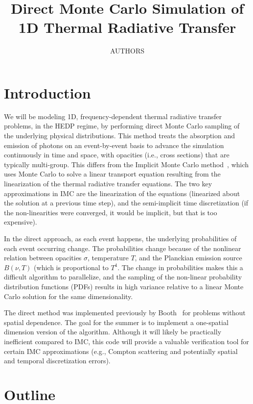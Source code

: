 \documentclass{article}
\title{Direct Monte Carlo Simulation of 1D Thermal Radiative Transfer}
\author{AUTHORS}
\begin{document}
\onehalfspacing

\section{Introduction}

We will be modeling 1D, frequency-dependent thermal radiative transfer problems,
in the HEDP regime, by performing direct Monte Carlo sampling of
the underlying physical distributions.  This method treats the absorption and
emission of photons on an event-by-event basis to advance the simulation
continuously in time and space, with opacities (i.e., cross sections) that are typically
multi-group.  This differs from the Implicit Monte Carlo
method~\cite{wollaber_review,wollaber_thesis}, which uses Monte
Carlo to solve a linear transport equation resulting from the linearization of
the thermal radiative transfer equations.  The two key approximations in IMC are
the linearization of the equations (linearized about the solution at a previous
time step), and the semi-implicit time discretization (if the non-linearities
were converged, it would be implicit, but that is too expensive).  

In the direct approach, as each event happens, the underlying probabilities of
each event occurring change.  The probabilities change because of the nonlinear relation between opacities
$\sigma$, temperature $T$, and the Planckian emission source $B(\nu,T)$ (which
is proportional to $T^4$.  The change in probabilities makes
this a difficult algorithm to parallelize, and the sampling of the non-linear
probability distribution functions (PDFs) results in high variance relative to
a linear Monte Carlo solution for the same dimensionality.

The direct method was implemented previously by Booth~\cite{booth2011} for
problems without spatial dependence.  The
goal for the summer is to implement a one-spatial dimension version of the
algorithm.  Although it will likely be practically inefficient compared to IMC, this code
will provide a valuable verification tool for certain IMC approximations (e.g.,
Compton scattering and potentially spatial and temporal discretization errors).  

\section{Outline}
\end{document}
